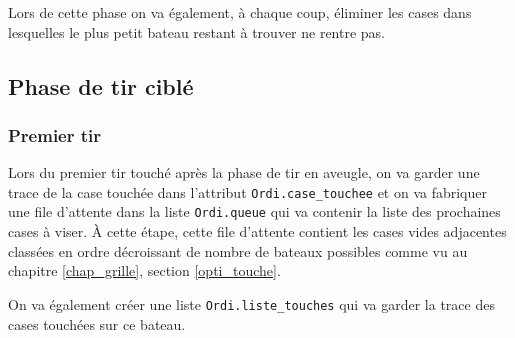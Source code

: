 Lors de cette phase on va également, à chaque coup, éliminer les cases dans lesquelles le plus petit bateau restant à trouver ne rentre pas.

\subsection{Phase de tir ciblé}
\subsubsection{Premier tir}
Lors du premier tir touché après la phase de tir en aveugle, on va garder une trace de la case touchée dans l'attribut \texttt{Ordi.case\_touchee} et on va fabriquer une file d'attente dans la liste \texttt{Ordi.queue} qui va contenir la liste des prochaines cases à viser. À cette étape, cette file d'attente contient les cases vides adjacentes classées en ordre décroissant de nombre de bateaux possibles comme vu au chapitre \ref{chap_grille}, section \ref{opti_touche}.

On va également créer une liste \texttt{Ordi.liste\_touches} qui va garder la trace des cases touchées sur ce bateau.

